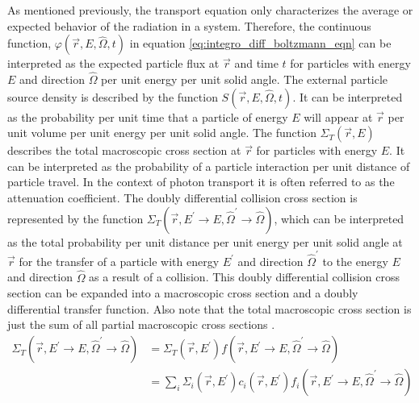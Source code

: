 As mentioned previously, the transport equation only characterizes the average
or expected behavior of the radiation in a system. Therefore, the
continuous function, $\varphi(\vec{r},E,\hat{\Omega},t)$ in equation 
\ref{eq:integro_diff_boltzmann_eqn} can be interpreted as the expected particle 
flux at $\vec{r}$ and time $t$ for particles with energy $E$ and direction
$\hat{\Omega}$ per unit energy per unit solid angle. The external particle 
source density is described by the function $S(\vec{r},E,\hat{\Omega},t)$. It 
can be interpreted as the probability per unit time that a particle of energy 
$E$ will appear at $\vec{r}$ per unit volume per unit energy per unit solid 
angle. The function $\Sigma_T(\vec{r},E)$ describes the total macroscopic cross 
section at $\vec{r}$ for particles with energy $E$. It can be interpreted as the
probability of a particle interaction per unit distance of particle travel. In 
the context of photon transport it is often referred to as the attenuation 
coefficient. The doubly differential collision cross section is represented by 
the function $\Sigma_T(\vec{r},E^{'} \to E,\hat{\Omega}^{'} \to \hat{\Omega})$, 
which can be interpreted as the total probability per unit distance per unit 
energy per unit solid angle at $\vec{r}$ for the transfer of a particle with 
energy $E^{'}$ and direction $\hat{\Omega}^{'}$ to the energy $E$ and direction 
$\hat{\Omega}$ as a result of a collision. This doubly differential collision 
cross section can be expanded into a macroscopic cross section and a doubly 
differential transfer function. Also note that the total macroscopic cross 
section is just the sum of all partial macroscopic cross sections
\citep{bell_nuclear_1979}.
\begin{align}
  \Sigma_T(\vec{r},E^{'} \to E,\hat{\Omega}^{'} \to \hat{\Omega}) & =
  \Sigma_T(\vec{r},E^{'})
  f(\vec{r},E^{'} \to E,\hat{\Omega}^{'} \to \hat{\Omega}) \\
  & = \sum_i \Sigma_i(\vec{r},E^{'}) c_i(\vec{r},E^{'})
  f_i(\vec{r},E^{'} \to E,\hat{\Omega}^{'} \to \hat{\Omega})
  \label{eq:expanded_diff_collision_cross_sec}
\end{align}

